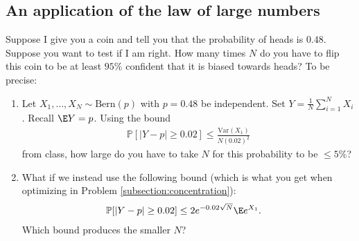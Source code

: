 \documentclass[12pt,reqno]{amsart}
\theoremstyle{definition}
\theoremstyle{remark}
\numberwithin{equation}{section}
\begin{document}
\subsection{An application of the law of large numbers}
Suppose I give you a coin and tell you that the probability of heads is $0.48$. Suppose you want to test if I am right. How many times $N$ do you have to flip this coin to be at least $95\%$ confident that it is biased towards heads? To be precise:
\begin{enumerate}
\item Let $X_{1},\ldots,X_{N}\sim\mathrm{Bern}(p)$ with $p=0.48$ be independent. Set $Y=\frac{1}{N}\sum_{i=1}^{N}X_{i}$. Recall $\E Y=p$. Using the bound 
%
\begin{align*}
\mathbb{P}[|Y-p|\geq 0.02]\leq \frac{\mathrm{Var}(X_{1})}{N(0.02)^{2}}
\end{align*}
%
from class, how large do you have to take $N$ for this probability to be $\leq5\%$?
\item What if we instead use the following bound (which is what you get when optimizing in Problem \ref{subsection:concentration}):
%
\begin{align*}
\mathbb{P}[|Y-p|\geq 0.02]&\leq 2e^{-0.02\sqrt{N}}\E e^{X_{1}}.
\end{align*}
%
Which bound produces the smaller $N$?
\end{enumerate}
\end{document}
